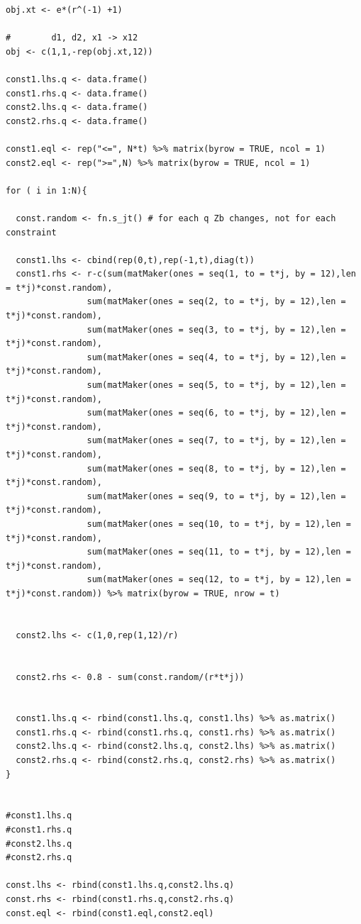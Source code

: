 \documentclass[a4paper,11pt]{article}
\begin{document}
\begin{verbatim}
obj.xt <- e*(r^(-1) +1)

#        d1, d2, x1 -> x12
obj <- c(1,1,-rep(obj.xt,12))

const1.lhs.q <- data.frame()
const1.rhs.q <- data.frame()
const2.lhs.q <- data.frame()
const2.rhs.q <- data.frame()

const1.eql <- rep("<=", N*t) %>% matrix(byrow = TRUE, ncol = 1)
const2.eql <- rep(">=",N) %>% matrix(byrow = TRUE, ncol = 1)

for ( i in 1:N){
  
  const.random <- fn.s_jt() # for each q Zb changes, not for each constraint 
  
  const1.lhs <- cbind(rep(0,t),rep(-1,t),diag(t))
  const1.rhs <- r-c(sum(matMaker(ones = seq(1, to = t*j, by = 12),len = t*j)*const.random),
                sum(matMaker(ones = seq(2, to = t*j, by = 12),len = t*j)*const.random),
                sum(matMaker(ones = seq(3, to = t*j, by = 12),len = t*j)*const.random),
                sum(matMaker(ones = seq(4, to = t*j, by = 12),len = t*j)*const.random),
                sum(matMaker(ones = seq(5, to = t*j, by = 12),len = t*j)*const.random),
                sum(matMaker(ones = seq(6, to = t*j, by = 12),len = t*j)*const.random),
                sum(matMaker(ones = seq(7, to = t*j, by = 12),len = t*j)*const.random),
                sum(matMaker(ones = seq(8, to = t*j, by = 12),len = t*j)*const.random),
                sum(matMaker(ones = seq(9, to = t*j, by = 12),len = t*j)*const.random),
                sum(matMaker(ones = seq(10, to = t*j, by = 12),len = t*j)*const.random),
                sum(matMaker(ones = seq(11, to = t*j, by = 12),len = t*j)*const.random),
                sum(matMaker(ones = seq(12, to = t*j, by = 12),len = t*j)*const.random)) %>% matrix(byrow = TRUE, nrow = t)
  

  const2.lhs <- c(1,0,rep(1,12)/r)

  
  const2.rhs <- 0.8 - sum(const.random/(r*t*j))
  
  
  const1.lhs.q <- rbind(const1.lhs.q, const1.lhs) %>% as.matrix()
  const1.rhs.q <- rbind(const1.rhs.q, const1.rhs) %>% as.matrix()
  const2.lhs.q <- rbind(const2.lhs.q, const2.lhs) %>% as.matrix()
  const2.rhs.q <- rbind(const2.rhs.q, const2.rhs) %>% as.matrix()
}


#const1.lhs.q
#const1.rhs.q
#const2.lhs.q
#const2.rhs.q

const.lhs <- rbind(const1.lhs.q,const2.lhs.q)
const.rhs <- rbind(const1.rhs.q,const2.rhs.q)
const.eql <- rbind(const1.eql,const2.eql)


\end{verbatim}
\end{document}
